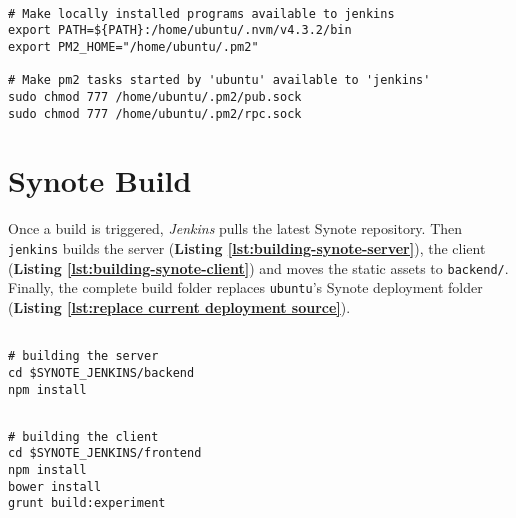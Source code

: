 \begin{listing}[H]
\begin{verbatim}

# Make locally installed programs available to jenkins
export PATH=${PATH}:/home/ubuntu/.nvm/v4.3.2/bin
export PM2_HOME="/home/ubuntu/.pm2"

# Make pm2 tasks started by 'ubuntu' available to 'jenkins'
sudo chmod 777 /home/ubuntu/.pm2/pub.sock
sudo chmod 777 /home/ubuntu/.pm2/rpc.sock

\end{verbatim}
\label{lst:jenkins-pm2-configuration}
\end{listing}

\section{Synote Build}
\label{sec:synote-build}

Once a build is triggered, \textit{Jenkins} pulls the latest Synote repository. Then \texttt{jenkins} builds the server (\textbf{Listing \ref{lst:building-synote-server}}), the client (\textbf{Listing \ref{lst:building-synote-client}}) and moves the static assets to \texttt{backend/}. Finally, the complete build folder replaces \texttt{ubuntu}'s Synote deployment folder (\textbf{Listing \ref{lst:replace current deployment source}}).\\

\begin{listing}[H]
\begin{verbatim}

# building the server
cd $SYNOTE_JENKINS/backend
npm install

\end{verbatim}
\label{lst:building-synote-server}
\end{listing}

\begin{listing}[H]
\begin{verbatim}

# building the client
cd $SYNOTE_JENKINS/frontend
npm install
bower install
grunt build:experiment

\end{verbatim}
\label{lst:building-synote-client}
\end{listing}

